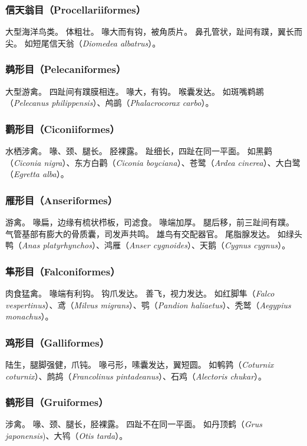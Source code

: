 \documentclass[11pt]{article}
\begin{document}
\subsubsection{信天翁目（Procellariiformes）}
大型海洋鸟类。
体粗壮。
喙大而有钩，被角质片。
鼻孔管状，趾间有蹼，翼长而尖。
如短尾信天翁（\textit{Diomedea albatrus}）。

\subsubsection{鹈形目（Pelecaniformes）}
大型游禽。
四趾间有蹼膜相连。
喙大，有钩。
喉囊发达。
如斑嘴鹈鹕（\textit{Pelecanus philippensis}）、鸬鹚（\textit{Phalacrocorax carbo}）。

\subsubsection{鹳形目（Ciconiiformes）}
水栖涉禽。
喙、颈、腿长。
胫裸露。
趾细长，四趾在同一平面。
如黑鹳（\textit{Ciconia nigra}）、东方白鹳（\textit{Ciconia boyciana}）、苍鹭（\textit{Ardea cinerea}）、大白鹭（\textit{Egretta alba}）。

\subsubsection{雁形目（Anseriformes）}
游禽。
喙扁，边缘有梳状栉板，司滤食。
喙端加厚。
腿后移，前三趾间有蹼。
气管基部有膨大的骨质囊，司发声共鸣。
雄鸟有交配器官。
尾脂腺发达。
如绿头鸭（\textit{Anas platyrhynchos}）、鸿雁（\textit{Anser cygnoides}）、天鹅（\textit{Cygnus cygnus}）。

\subsubsection{隼形目（Falconiformes）}
肉食猛禽。
喙端有利钩。
钩爪发达。
善飞，视力发达。
如红脚隼（\textit{Falco vespertinus}）、鸢（\textit{Milvus migrans}）、鹗（\textit{Pandion haliaetus}）、秃鹫（\textit{Aegypius monachus}）。

\subsubsection{鸡形目（Galliformes）}
陆生，腿脚强健，爪钝。
喙弓形，嗉囊发达，翼短圆。
如鹌鹑（\textit{Coturnix coturnix}）、鹧鸪（\textit{Francolinus pintadeanus}）、石鸡（\textit{Alectoris chukar}）。

\subsubsection{鹤形目（Gruiformes）}
涉禽。
喙、颈、腿长，胫裸露。
四趾不在同一平面。
如丹顶鹤（\textit{Grus japonensis})、大鸨（\textit{Otis tarda}）。
\end{document}
